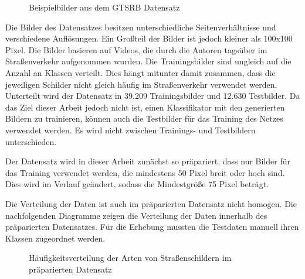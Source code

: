 \begin{figure}[H]
\begin{subfigure}[b]{0.125\textwidth}
    \caption{}
    \label{fig:gtrsb-paper-bsp-image-4}
\end{subfigure}
      \caption{Beispielbilder aus dem \acs{GTSRB} Datensatz \cite{GTSRB}}
      \label{fig:gtrsb-paper-bsp-images}
\end{figure}

Die Bilder des Datensatzes besitzen unterschiedliche Seitenverhältnisse und verschiedene Auflösungen. Ein Großteil der Bilder ist jedoch kleiner als 100x100 Pixel. Die Bilder basieren auf Videos, die durch die Autoren tagsüber im Straßenverkehr aufgenommen wurden. Die Trainingsbilder sind ungleich auf die Anzahl an Klassen verteilt. Dies hängt mitunter damit zusammen, dass die jeweiligen Schilder nicht gleich häufig im Straßenverkehr verwendet werden. Unterteilt wird der Datensatz in 39.209 Trainingsbilder und 12.630 Testbilder. Da das Ziel dieser Arbeit jedoch nicht ist, einen Klassifikator mit den generierten Bildern zu trainieren, können auch die Testbilder für das Training des Netzes verwendet werden. Es wird nicht zwischen Trainings- und Testbildern unterschieden. \cite{GTSRB}

Der Datensatz wird in dieser Arbeit zunächst so präpariert, dass nur Bilder für das Training verwendet werden, die mindestens 50 Pixel breit oder hoch sind. Dies wird im Verlauf geändert, sodass die Mindestgröße 75 Pixel beträgt.

Die Verteilung der Daten ist auch im präparierten Datensatz nicht homogen. Die nachfolgenden Diagramme zeigen die Verteilung der Daten innerhalb des präparierten Datensatzes. Für die Erhebung mussten die Testdaten manuell ihren Klassen zugeordnet werden.


\begin{figure}
\centering
{}
\caption{Häufigkeitsverteilung der Arten von Straßenschildern im präparierten Datensatz}
\end{figure}

